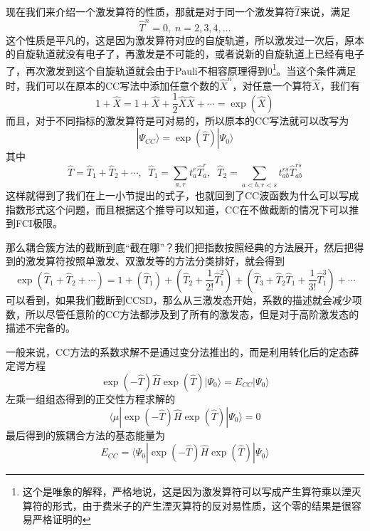 \documentclass[12pt,a4paper,openany,twoside]{book}
\numberwithin{equation}{section}
\begin{document}
          现在我们来介绍一个激发算符的性质，那就是对于同一个激发算符$\hat{T}$来说，满足
          \begin{equation}
            \hat{T}^n = 0, \; n =2,3,4,\dots
          \end{equation}
          这个性质是平凡的，这是因为激发算符对应的自旋轨道，所以激发过一次后，原本的自旋轨道就没有电子了，再激发是不可能的，或者说新的自旋轨道上已经有电子了，再次激发到这个自旋轨道就会由于Pauli不相容原理得到0\footnote{这个是唯象的解释，严格地说，这是因为激发算符可以写成产生算符乘以湮灭算符的形式，由于费米子的产生湮灭算符的反对易性质，这个零的结果是很容易严格证明的}。当这个条件满足时，我们可以在原本的CC写法中添加任意个数的$\hat{X}^n$，对任意一个算符$\hat{X}$，我们有
          \begin{equation}
            1+\hat{X}=1+\hat{X}+\frac{1}{2} \hat{X} \hat{X}+\cdots=\exp \left(\hat{X}\right)
          \end{equation}
          而且，对于不同指标的激发算符是可对易的，所以原本的CC写法就可以改写为
          \begin{equation}
            |\Psi_{CC}\rangle=\exp(\hat{T})|\Psi_{0}\rangle
          \end{equation}
          其中
          \begin{equation}
            \hat{T} = \hat{T}_1 +\hat{T}_2 +\cdots, \;\;\hat{T}_1 = \sum_{a,r}t_a^r\hat{T}_a^r,\;\;\hat{T}_2 = \sum_{a<b,r<s}t_{ab}^{rs}\hat{T}_{ab}^{rs}
          \end{equation}
          这样就得到了我们在上一小节提出的式子，也就回到了CC波函数为什么可以写成指数形式这个问题，而且根据这个推导可以知道，CC在不做截断的情况下可以推到FCI极限。

          那么耦合簇方法的截断到底“截在哪”？我们把指数按照经典的方法展开，然后把得到的激发算符按照单激发、双激发等的方法分类排好，就会得到
          \begin{equation}
            \exp(\hat{T}_1 +\hat{T}_2 +\cdots) = 1 + (\hat{T}_1) + (\hat{T}_2 + \frac{1}{2!}\hat{T}_1^2) + (\hat{T}_3 + \hat{T}_2\hat{T}_1 + \frac{1}{3!}\hat{T}_1^3) + \cdots
          \end{equation}
          可以看到，如果我们截断到CCSD，那么从三激发态开始，系数的描述就会减少项数，所以尽管任意阶的CC方法都涉及到了所有的激发态，但是对于高阶激发态的描述不完备的。

          一般来说，CC方法的系数求解不是通过变分法推出的，而是利用转化后的定态薛定谔方程
          \begin{equation}
            \exp (-\hat{T}) \hat{H} \exp (\hat{T})|\Psi_0\rangle= E_{{CC}}|\Psi_0\rangle
          \end{equation}
          左乘一组组态得到的正交性方程求解的
          \begin{equation}
            \langle\mu|\exp (-\hat{T}) \hat{H} \exp (\hat{T})| \Psi_0\rangle= 0
          \end{equation}
          最后得到的簇耦合方法的基态能量为
          \begin{equation}
            E_{{CC}}=\langle\Psi_0|\exp (-\hat{T}) \hat{H} \exp (\hat{T})| \Psi_0\rangle
          \end{equation}          
\end{document}
